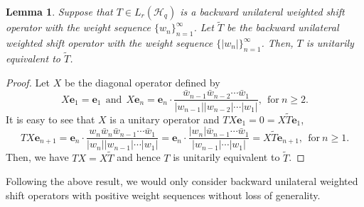 \documentclass[pdflatex,sn-mathphys-num]{sn-jnl}%
\theoremstyle{thmstyleone}%
\theoremstyle{thmstyletwo}%
\theoremstyle{thmstylethree}%
\newtheorem{lemma}{Lemma}%
\newtheorem{lemma}[theorem]{Lemma}
\theoremstyle{definition}
\theoremstyle{remark}
\begin{document}
	\begin{lemma}\label{BUWSS}
	Suppose that $T \in L_r(\mathcal{H}_q)$ is a backward unilateral weighted shift operator with the weight sequence $\{w_n\}_{n=1}^{\infty}$. 	Let $\widetilde{T}$ be the backward unilateral weighted shift operator with the weight sequence $\{|w_n|\}_{n=1}^{\infty}$. Then, $T$ is unitarily equivalent to $\widetilde{T}$.
	\end{lemma}


    \begin{proof}
    Let $X$ be the diagonal operator defined by
    \[
    X\mathbf{e}_1=\mathbf{e}_1 \ \ \text{and} \ \ X\mathbf{e}_{n}=\mathbf{e}_n\cdot \frac{\bar{w}_{n-1}\bar{w}_{n-2}\cdots\bar{w}_1}{|w_{n-1}||w_{n-2}|\cdots|w_1|},\ \ \text{for} \ n\geq 2.
    \]
    It is easy to see that $X$ is a unitary operator and $TX\mathbf{e}_1=0=X\widetilde{T}\mathbf{e}_1$,
    \[
    TX\mathbf{e}_{n+1}=\mathbf{e}_{n}\cdot \frac{{w}_{n}\bar{w}_{n}\bar{w}_{n-1}\cdots\bar{w}_1}{|w_{n}||w_{n-1}|\cdots|w_1|}=\mathbf{e}_{n}\cdot \frac{|{w}_{n}|\bar{w}_{n-1}\cdots\bar{w}_1}{|w_{n-1}|\cdots|w_1|}=X\widetilde{T}\mathbf{e}_{n+1}, \ \ \text{for} \ n\geq 1.
    \]
Then, we have $TX=X\widetilde{T}$ and hence $T$ is unitarily equivalent to $\widetilde{T}$.
    \end{proof}	

Following the above result, we would only consider backward unilateral weighted shift operators with positive weight sequences without loss of generality.
\end{document}

